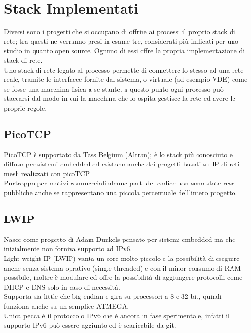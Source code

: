 \section{Stack Implementati}
Diversi sono i progetti che si occupano di offrire ai processi il proprio stack di rete; tra questi ne verranno presi in esame tre, considerati pi\`u indicati per uno studio in quanto open source. Ognuno di essi offre la propria implementazione di stack di rete.\\
Uno stack di rete legato al processo permette di connettere lo stesso ad una rete reale, tramite le interfacce fornite dal sistema, o virtuale (ad esempio VDE) come se fosse una macchina fisica a se stante, a questo punto ogni processo pu\`o staccarsi dal modo in cui la macchina che lo ospita gestisce la rete ed avere le proprie regole.\\

\subsection{PicoTCP}
PicoTCP\cite{K4} \`e supportato da Tass Belgium (Altran); \`e lo stack pi\`u conosciuto e diffuso per sistemi embedded ed esistono anche dei progetti basati su IP di reti mesh realizzati con picoTCP\cite{K14}.\\
Purtroppo per motivi commerciali alcune parti del codice non sono state rese pubbliche anche se rappresentano una piccola percentuale dell'intero progetto.
\subsection{LWIP}
Nasce come progetto di Adam Dunkels pensato per sistemi embedded ma che inizialmente non forniva supporto ad IPv6.\\
Light-weight IP (LWIP\cite{K13}) vanta un core molto piccolo e la possibilit\`a di eseguire anche senza sistema oprativo (single-threaded) e con il minor consumo di RAM possibile, inoltre \`e modulare ed offre la possibilit\`a di aggiungere protocolli come DHCP e DNS solo in caso di necessit\`a.\\
Supporta sia little che big endian e gira su processori a 8 e 32 bit, quindi funziona anche su un semplice ATMEGA.\\
Unica pecca \`e il protoccolo IPv6 che \`e ancora in fase sperimentale, infatti il supporto IPv6 pu\`o essere aggiunto ed \`e scaricabile da git.
